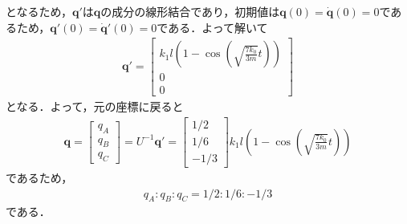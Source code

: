 \documentclass[12pt,dvipdfmx]{jsarticle}
\begin{document}
となるため，$\bm{q}'$は$\bm{q}$の成分の線形結合であり，初期値は$\bm{q}(0)=\dot{\bm{q}}(0)=0$であるため，$\bm{q}'(0)=\dot{\bm{q}}'(0)=0$である．よって解いて
\begin{eqnarray}
  \bm{q}'=
  \begin{bmatrix}
    k_1l\left( 1-\cos\left( \sqrt{\frac{7k_0}{3m}}t \right) \right)\\
    0\\
    0
  \end{bmatrix}
\end{eqnarray}
となる．よって，元の座標に戻ると
\begin{eqnarray}
  \bm{q} =
  \begin{bmatrix}
    q_A \\
    q_B \\
    q_C
  \end{bmatrix}
  =U^{-1} \bm{q}'=
  \begin{bmatrix}
    1/2\\
    1/6\\
    -1/3
  \end{bmatrix}
  k_1l\left( 1-\cos\left( \sqrt{\frac{7k_0}{3m}}t \right) \right)
\end{eqnarray}
であるため，
\begin{eqnarray}
  q_A:q_B:q_C = 1/2:1/6:-1/3
\end{eqnarray}
である．
\end{document}

